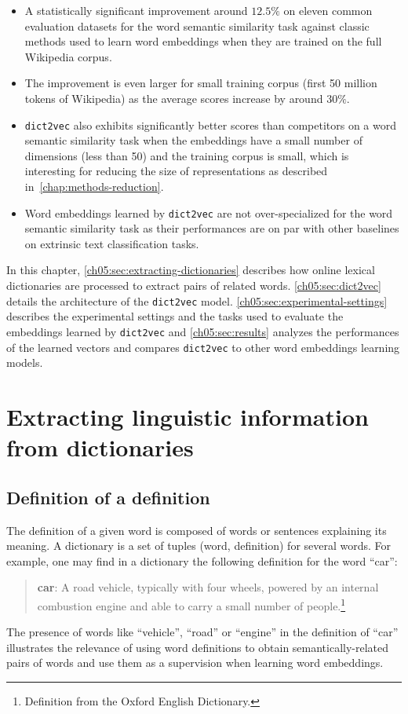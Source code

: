   \begin{itemize}
    \item A statistically significant improvement around $12.5\%$ on eleven
      common evaluation datasets for the word semantic similarity task against
      classic methods used to learn word embeddings when they are trained on the
      full Wikipedia corpus.
    \item The improvement is even larger for small training corpus (first 50
      million tokens of Wikipedia) as the average scores increase by around
      $30\%$.
    \item \texttt{dict2vec} also exhibits significantly better scores than
      competitors on a word semantic similarity task when the embeddings have a
      small number of dimensions (less than 50) and the training corpus is
      small, which is interesting for reducing the size of representations as
      described in~\autoref{chap:methods-reduction}.
    \item Word embeddings learned by \texttt{dict2vec} are not over-specialized
      for the word semantic similarity task as their performances are on par
      with other baselines on extrinsic text classification tasks.
  \end{itemize}

  In this chapter, \autoref{ch05:sec:extracting-dictionaries} describes how
  online lexical dictionaries are processed to extract pairs of related words.
  \autoref{ch05:sec:dict2vec} details the architecture of the \texttt{dict2vec}
  model. \autoref{ch05:sec:experimental-settings} describes the experimental
  settings and the tasks used to evaluate the embeddings learned by
  \texttt{dict2vec} and \autoref{ch05:sec:results} analyzes the performances of
  the learned vectors and compares \texttt{dict2vec} to other word embeddings
  learning models.

\section{Extracting linguistic information from dictionaries}
  \label{ch05:sec:extracting-dictionaries}
  \subsection{Definition of a definition}
    The definition of a given word is composed of words or sentences explaining
    its meaning. A dictionary is a set of tuples (word, definition) for several
    words. For example, one may find in a dictionary the following definition
    for the word ``car'':
    \begin{quote}
      \textbf{car}: A road vehicle, typically with four wheels, powered by an
      internal combustion engine and able to carry a small number of
      people.\footnote{Definition from the Oxford English Dictionary.}
    \end{quote}
    The presence of words like ``vehicle'', ``road'' or ``engine'' in the
    definition of ``car'' illustrates the relevance of using word definitions to
    obtain semantically-related pairs of words and use them as a supervision
    when learning word embeddings.

